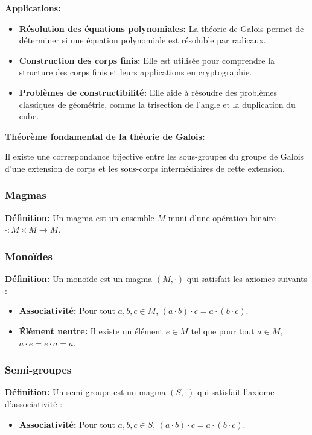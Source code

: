 \textbf{Applications:}
\begin{itemize}
    \item \textbf{Résolution des équations polynomiales:} La théorie de Galois permet de déterminer si une équation polynomiale est résoluble par radicaux.
    \item \textbf{Construction des corps finis:} Elle est utilisée pour comprendre la structure des corps finis et leurs applications en cryptographie.
    \item \textbf{Problèmes de constructibilité:} Elle aide à résoudre des problèmes classiques de géométrie, comme la trisection de l'angle et la duplication du cube.
\end{itemize}

\textbf{Théorème fondamental de la théorie de Galois:}

Il existe une correspondance bijective entre les sous-groupes du groupe de Galois d'une extension de corps et les sous-corps intermédiaires de cette extension.
\subsubsection{Magmas}

\textbf{Définition:}
Un magma est un ensemble $M$ muni d'une opération binaire $\cdot : M \times M \to M$.

\subsubsection{Monoïdes}

\textbf{Définition:}
Un monoïde est un magma $(M, \cdot)$ qui satisfait les axiomes suivants :
\begin{itemize}
    \item \textbf{Associativité:} Pour tout $a, b, c \in M$, $(a \cdot b) \cdot c = a \cdot (b \cdot c)$.
    \item \textbf{Élément neutre:} Il existe un élément $e \in M$ tel que pour tout $a \in M$, $a \cdot e = e \cdot a = a$.
\end{itemize}

\subsubsection{Semi-groupes}

\textbf{Définition:}
Un semi-groupe est un magma $(S, \cdot)$ qui satisfait l'axiome d'associativité :
\begin{itemize}
    \item \textbf{Associativité:} Pour tout $a, b, c \in S$, $(a \cdot b) \cdot c = a \cdot (b \cdot c)$.
\end{itemize}


